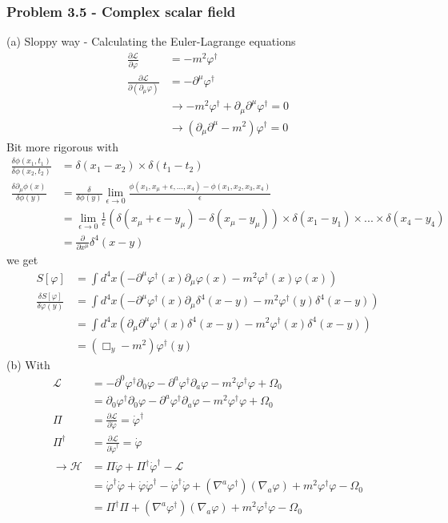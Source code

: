 \documentclass[10pt,a4paper]{book}
\theoremstyle{definition}
\begin{document}
\subsubsection{Problem 3.5 - Complex scalar field}
(a) Sloppy way - Calculating the Euler-Lagrange equations
\begin{align}
\frac{\partial\mathcal{L}}{\partial\varphi}
&=-m^2\varphi^\dagger\\
\frac{\partial\mathcal{L}}{\partial(\partial_\mu\varphi)}&=-\partial^\mu\varphi^\dagger\\
&\rightarrow -m^2\varphi^\dagger+\partial_\mu\partial^\mu\varphi^\dagger=0\\
&\rightarrow (\partial_\mu\partial^\mu-m^2)\varphi^\dagger=0
\end{align}
Bit more rigorous with
\begin{align}
\frac{\delta\phi(x_1,t_1)}{\delta\phi(x_2,t_2)}&=\delta(x_1-x_2)\times\delta(t_1-t_2)\\
\frac{\delta\partial_\mu\phi(x)}{\delta\phi(y)}&=\frac{\delta}{\delta\phi(y)}\lim_{\epsilon\rightarrow0}\frac{\phi(x_1,x_\mu+\epsilon,...,x_4)-\phi(x_1,x_2,x_3,x_4)}{\epsilon}\\
&=\lim_{\epsilon\rightarrow0}\frac{1}{\epsilon}\left(\delta(x_\mu+\epsilon-y_\mu)-\delta(x_\mu-y_\mu)\right)\times\delta(x_1-y_1)\times...\times\delta(x_4-y_4)\\
&=\frac{\partial}{\partial x^\mu}\delta^4(x-y)
\end{align}
we get
\begin{align}
S[\varphi]
&=\int d^4x\left(-\partial^\mu\varphi^\dagger(x)\partial_\mu\varphi(x)-m^2\varphi^\dagger(x)\varphi(x)\right)\\
\frac{\delta S[\varphi]}{\delta\varphi(y)}
&=\int d^4x\left(-\partial^\mu\varphi^\dagger(x)\partial_\mu\delta^4(x-y)-m^2\varphi^\dagger(y)\delta^4(x-y)\right)\\
&=\int d^4x\left(\partial_\mu\partial^\mu\varphi^\dagger(x)\delta^4(x-y)-m^2\varphi^\dagger(x)\delta^4(x-y)\right)\\
&=(\Box_y-m^2)\varphi^\dagger(y)
\end{align}
(b) With
\begin{align}
\mathcal{L}
&=-\partial^0\varphi^\dagger\partial_0\varphi-\partial^a\varphi^\dagger\partial_a\varphi-m^2\varphi^\dagger\varphi+\Omega_0\\
&=\partial_0\varphi^\dagger\partial_0\varphi-\partial^a\varphi^\dagger\partial_a\varphi-m^2\varphi^\dagger\varphi+\Omega_0\\
\Pi&=\frac{\partial\mathcal{L}}{\partial\dot\varphi}
=\dot\varphi^\dagger\\
\Pi^\dagger&=\frac{\partial\mathcal{L}}{\partial\dot\varphi^\dagger}
=\dot\varphi\\
\rightarrow\mathcal{H}&=\Pi\dot\varphi+\Pi^\dagger\dot\varphi^\dagger-\mathcal{L}\\
&=\dot\varphi^\dagger\dot\varphi+\dot\varphi\dot\varphi^\dagger-\dot\varphi^\dagger\dot\varphi+(\nabla^a\varphi^\dagger)(\nabla_a\varphi)+m^2\varphi^\dagger\varphi-\Omega_0\\
&=\Pi^\dagger\Pi+(\nabla^a\varphi^\dagger)(\nabla_a\varphi)+m^2\varphi^\dagger\varphi-\Omega_0
\end{align}
\end{document}
